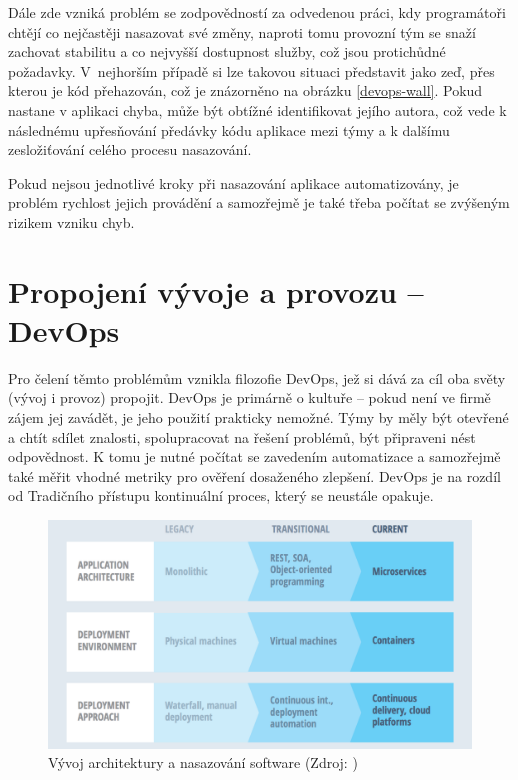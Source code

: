 \documentclass[FM,DP]{tulthesis}
\begin{document}
Dále zde vzniká problém se zodpovědností za odvedenou práci, kdy programátoři chtějí co nejčastěji
nasazovat své změny, naproti tomu provozní tým se snaží zachovat stabilitu a co nejvyšší dostupnost
služby, což jsou protichůdné požadavky. V~nejhorším případě si lze takovou situaci představit 
jako zeď, přes kterou je kód přehazován, což je znázorněno na obrázku \ref{devops-wall}.
Pokud nastane v aplikaci chyba, může být obtížné identifikovat jejího autora, což vede k následnému
upřesňování předávky kódu aplikace mezi týmy a k dalšímu zesložiťování celého procesu nasazování.

Pokud nejsou jednotlivé kroky při nasazování aplikace automatizovány, je problém rychlost jejich provádění
a samozřejmě je také třeba počítat se zvýšeným rizikem vzniku chyb. 

\section{Propojení vývoje a provozu -- DevOps}

Pro čelení těmto problémům vznikla filozofie DevOps, jež si dává za cíl oba světy (vývoj i provoz) propojit.
DevOps je primárně o kultuře -- pokud není ve firmě zájem jej zavádět, je jeho použití prakticky nemožné. Týmy
by měly být otevřené a chtít sdílet znalosti, spolupracovat na řešení problémů, být připraveni nést odpovědnost.
K tomu je nutné počítat se zavedením automatizace a samozřejmě také měřit vhodné metriky pro ověření dosaženého
zlepšení. DevOps je na rozdíl od Tradičního přístupu kontinuální proces, který se neustále opakuje.

\begin{figure}[h]
\center
\includegraphics[width=\textwidth]{devops-vs-traditional.png}
\caption{Vývoj architektury a nasazování software (Zdroj: \cite[strana~109]{microservices})}
\label{devops-vs-traditional}
\end{figure}
\end{document}
